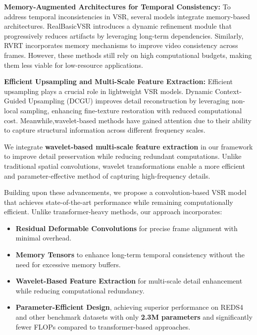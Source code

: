 
\textbf{Memory-Augmented Architectures for Temporal Consistency:}  
To address temporal inconsistencies in VSR, several models integrate memory-based architectures. RealBasicVSR \cite{chan2022investigating} introduces a dynamic refinement module that progressively reduces artifacts by leveraging long-term dependencies. Similarly, RVRT \cite{liang2022rvrt} incorporates memory mechanisms to improve video consistency across frames. However, these methods still rely on high computational budgets, making them less viable for low-resource applications.  


\textbf{Efficient Upsampling and Multi-Scale Feature Extraction:}  
Efficient upsampling plays a crucial role in lightweight VSR models. Dynamic Context-Guided Upsampling (DCGU) \cite{huang2024dynamic} improves detail reconstruction by leveraging non-local sampling, enhancing fine-texture restoration with reduced computational cost. Meanwhile,wavelet-based methods have gained attention due to their ability to capture structural information across different frequency scales.  

We integrate \textbf{wavelet-based multi-scale feature extraction} in our framework to improve detail preservation while reducing redundant computations. Unlike traditional spatial convolutions, wavelet transformations enable a more efficient and parameter-effective method of capturing high-frequency details.

Building upon these advancements, we propose a convolution-based VSR model that achieves state-of-the-art performance while remaining computationally efficient. Unlike transformer-heavy methods, our approach incorporates:
\begin{itemize}
    \item \textbf{Residual Deformable Convolutions} for precise frame alignment with minimal overhead.
    \item \textbf{Memory Tensors} to enhance long-term temporal consistency without the need for excessive memory buffers.
    \item \textbf{Wavelet-Based Feature Extraction} for multi-scale detail enhancement while reducing computational redundancy.
    \item \textbf{Parameter-Efficient Design}, achieving superior performance on REDS4 and other benchmark datasets with only \textbf{2.3M parameters} and significantly fewer FLOPs compared to transformer-based approaches.
\end{itemize}

